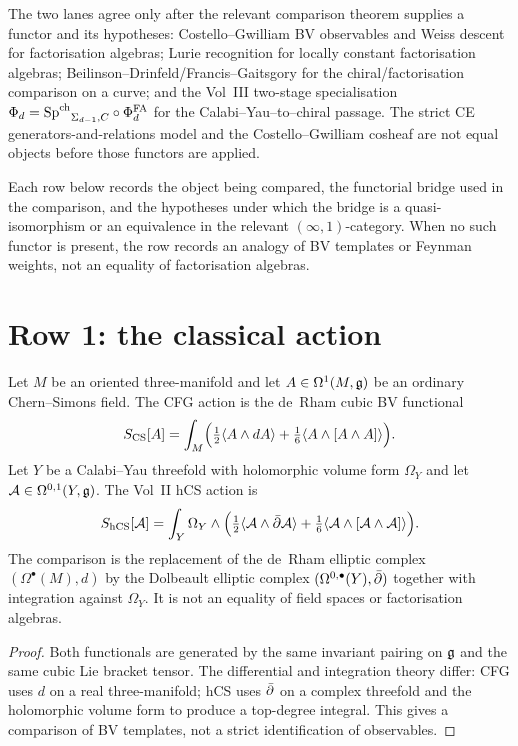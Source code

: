 The two lanes agree only after the relevant comparison theorem supplies
a functor and its hypotheses: Costello--Gwilliam BV observables and
Weiss descent for factorisation algebras; Lurie recognition for locally
constant factorisation algebras; Beilinson--Drinfeld/Francis--Gaitsgory
for the chiral/factorisation comparison on a curve; and the Vol~III
two-stage specialisation
$\Phi_d = {\mathrm{Sp}^{\mathrm{ch}}}_{\Sigma_{d-1}, C} \circ \Phi^{\mathrm{FA}}_d$ for the
Calabi--Yau--to--chiral passage. The strict CE
generators-and-relations model and the Costello--Gwilliam cosheaf are
not equal objects before those functors are applied.

Each row below records the object being compared, the functorial bridge
used in the comparison, and the hypotheses under which the bridge is a
quasi-isomorphism or an equivalence in the relevant
$(\infty,1)$-category. When no such functor is present, the row records
an analogy of BV templates or Feynman weights, not an equality of
factorisation algebras.

\section{Row 1: the classical action}
\label{sec:cfg-row-1-classical-action}

\begin{theorem}
\label{thm:cfg-row-1}
Let $M$ be an oriented three-manifold and let
$A\in\Omega^1(M,\mathfrak{g})$ be an ordinary Chern--Simons field. The CFG action
is the de~Rham cubic BV functional
\[
 S_{\mathrm{CS}}[A] =
 \int_M \Bigl(\tfrac12\langle A\wedge dA\rangle
 + \tfrac16\langle A\wedge[A\wedge A]\rangle\Bigr).
\]
Let $Y$ be a Calabi--Yau threefold with holomorphic volume form
$\Omega_Y$ and let $\mathcal{A}\in\Omega^{0,1}(Y,\mathfrak{g})$. The Vol~II hCS action is
\[
 S_{\mathrm{hCS}}[\mathcal{A}] = \int_Y \Omega_Y \wedge
 \Bigl( \tfrac12\langle \mathcal{A}\wedge \bar\partial\mathcal{A}\rangle
 + \tfrac16\langle\mathcal{A}\wedge[\mathcal{A}\wedge\mathcal{A}]\rangle\Bigr).
\]
The comparison is the replacement of the de~Rham elliptic complex
$(\Omega^\bullet(M),d)$ by the Dolbeault elliptic complex
$(\Omega^{0,\bullet}(Y),\bar\partial)$ together with integration against
$\Omega_Y$. It is not an equality of field spaces or factorisation
algebras.
\end{theorem}

\begin{proof}
Both functionals are generated by the same invariant pairing on $\mathfrak{g}$
and the same cubic Lie bracket tensor. The differential and integration
theory differ: CFG uses $d$ on a real three-manifold; hCS uses $\bar\partial$
on a complex threefold and the holomorphic volume form to produce a
top-degree integral. This gives a comparison of BV templates, not a
strict identification of observables.
\end{proof}

